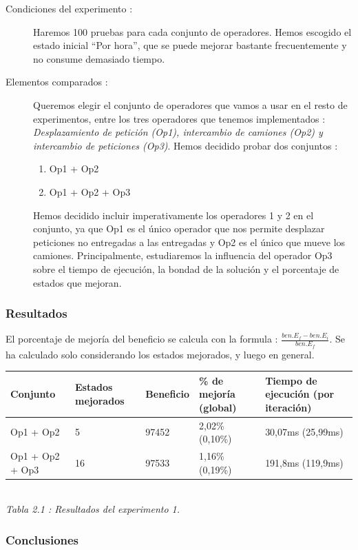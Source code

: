 \documentclass{article}
\begin{document}
\begin{description}
\item[Condiciones del experimento :] Haremos 100 pruebas para cada conjunto de
operadores. Hemos escogido el estado inicial ``Por hora'', que se puede mejorar
bastante frecuentemente y no consume demasiado tiempo.
\item[Elementos comparados :] Queremos elegir el conjunto de operadores que
vamos a usar en el resto de experimentos, entre los tres operadores que tenemos
implementados : \emph{Desplazamiento de petición (Op1), intercambio de camiones
(Op2) y intercambio de peticiones (Op3)}. Hemos decidido probar dos conjuntos :
\begin{enumerate}
\item Op1 + Op2
\item Op1 + Op2 + Op3
\end{enumerate}
Hemos decidido incluir imperativamente los operadores 1 y 2 en el conjunto, ya
que Op1 es el único operador que nos permite desplazar peticiones no entregadas
a las entregadas y Op2 es el único que mueve los camiones. Principalmente,
estudiaremos la influencia del operador Op3 sobre el tiempo de ejecución, la
bondad de la solución y el porcentaje de estados que mejoran.
\end{description}

\subsubsection{Resultados}

El porcentaje de mejoría del beneficio se calcula con la formula :
$\frac{ben. E_f - ben. E_i}{ben. E_f}$. Se ha calculado solo considerando los
estados mejorados, y luego en general.

\begin{center}
\begin{tabular}{|l|l|l|l|l|}
\hline
Conjunto & Estados mejorados & Beneficio &  \% de mejoría (global) & Tiempo de
ejecución (por iteración)\\
\hline
Op1 + Op2 & 5 & 97452 & 2,02\% (0,10\%) & 30,07ms (25,99ms)\\
\hline
Op1 + Op2 + Op3 & 16 & 97533 & 1,16\% (0,19\%) & 191,8ms (119,9ms)\\
\hline
\end{tabular}\\
{\it Tabla 2.1 : Resultados del experimento 1.}
\end{center}

\subsubsection{Conclusiones}
\end{document}
